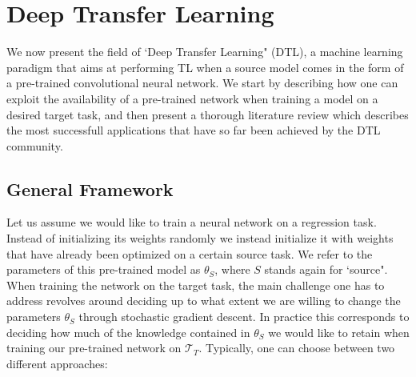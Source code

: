 \section{Deep Transfer Learning}
\label{sec:literature_review}

We now present the field of `Deep Transfer Learning" (DTL), a machine learning paradigm that aims at performing TL when a source model comes in the form of a pre-trained convolutional neural network. We start by describing how one can exploit the availability of a pre-trained network when training a model on a desired target task, and then present a thorough literature review which describes the most successfull applications that have so far been achieved by the DTL community.

\subsection{General Framework}
\label{sec:tl_general_framework}

Let us assume we would like to train a neural network on a regression task. Instead of initializing its weights randomly we instead initialize it with weights that have already been optimized on a certain source task. We refer to the parameters of this pre-trained model as $\theta_S$, where $S$ stands again for `source". When training the network on the target task, the main challenge one has to address revolves around deciding up to what extent we are willing to change the parameters $\theta_S$ through stochastic gradient descent. In practice this corresponds to deciding how much of the knowledge contained in $\theta_S$ we would like to retain when training our pre-trained network on $\mathcal{T}_T$. Typically, one can choose between two different approaches:  

